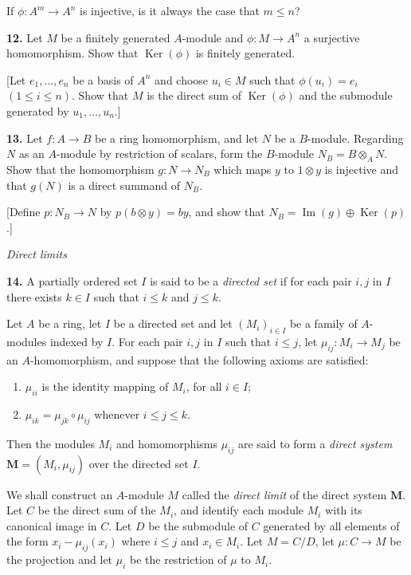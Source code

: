 If $\phi:A^m\longrightarrow A^n$ is injective, is it always the case that $m\leq n$?

\medskip
\noindent\textbf{12.} Let $M$ be a finitely generated $A$-module and $\phi:M\longrightarrow A^n$ a surjective homomorphism.  Show that $\operatorname{Ker}(\phi)$ is finitely generated.

[Let $e_1,\ldots,e_n$ be a basis of $A^n$ and choose $u_i\in M$ such that $\phi(u_i)=e_i$
$(1\leq i\leq n)$.  Show that $M$ is the direct sum of $\operatorname{Ker}(\phi)$ and the submodule
generated by $u_1,\ldots,u_n$.]

\medskip
\noindent\textbf{13.} Let $f:A\longrightarrow B$ be a ring homomorphism, and let $N$ be a $B$-module.  Regarding $N$
as an $A$-module by restriction of scalars, form the $B$-module $N_B=B\otimes_A N$.
Show that the homomorphism $g:N\longrightarrow N_B$ which maps $y$ to $1\otimes y$ is injective
and that $g(N)$ is a direct summand of $N_B$.

[Define $p:N_B\longrightarrow N$ by $p(b\otimes y)=by$, and show that $N_B=\operatorname{Im}(g)\oplus\operatorname{Ker}(p)$.]

\medskip
\noindent\emph{Direct limits}

\medskip
\noindent\amstar\textbf{14.} A partially ordered set $I$ is said to be a \emph{directed set} if for each pair $i,j$ in $I$ there
exists $k\in I$ such that $i\leq k$ and $j\leq k$.

Let $A$ be a ring, let $I$ be a directed set and let $(M_i)_{i\in I}$ be a family of $A$-modules
indexed by $I$.  For each pair $i,j$ in $I$ such that $i\leq j$, let $\mu_{ij}:M_i\longrightarrow M_j$ be an
$A$-homomorphism, and suppose that the following axioms are satisfied:
\begin{enumerate}
\renewcommand{\labelenumi}{(\arabic{enumi})}
\item $\mu_{ii}$ is the identity mapping of $M_i$, for all $i\in I$;
\item $\mu_{ik}=\mu_{jk}\circ\mu_{ij}$ whenever $i\leq j\leq k$.
\end{enumerate}
Then the modules $M_i$ and homomorphisms $\mu_{ij}$ are said to form a \emph{direct system}
$\mathbf M=(M_i,\mu_{ij})$ over the directed set $I$.

We shall construct an $A$-module $M$ called the \emph{direct limit} of the direct
system $\mathbf M$.  Let $C$ be the direct sum of the $M_i$, and identify each module $M_i$ with
its canonical image in $C$.  Let $D$ be the submodule of $C$ generated by all elements
of the form $x_i-\mu_{ij}(x_i)$ where $i\leq j$ and $x_i\in M_i$.  Let $M=C/D$, let $\mu:C\longrightarrow M$
be the projection and let $\mu_i$ be the restriction of $\mu$ to $M_i$.

